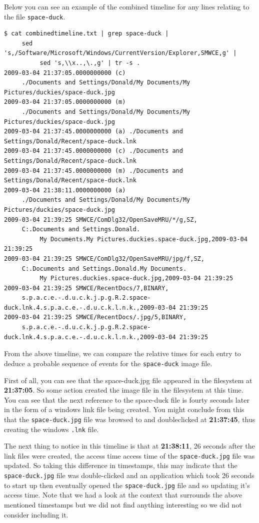 \documentclass[a4paper,
    11pt,
    normalheadings,
    parindent,
    UKenglish,
    abstracton,
    ]{scrartcl}
\begin{document}
Below you can see an example of the combined timeline for any lines relating to the file \texttt{space-duck}.
\begin{verbatim}
$ cat combinedtimeline.txt | grep space-duck |
     sed 's,/Software/Microsoft/Windows/CurrentVersion/Explorer,SMWCE,g' |
          sed 's,\\x..,\.,g' | tr -s .
2009-03-04 21:37:05.0000000000 (c)
     ./Documents and Settings/Donald/My Documents/My Pictures/duckies/space-duck.jpg
2009-03-04 21:37:05.0000000000 (m)
     ./Documents and Settings/Donald/My Documents/My Pictures/duckies/space-duck.jpg
2009-03-04 21:37:45.0000000000 (a) ./Documents and Settings/Donald/Recent/space-duck.lnk
2009-03-04 21:37:45.0000000000 (c) ./Documents and Settings/Donald/Recent/space-duck.lnk
2009-03-04 21:37:45.0000000000 (m) ./Documents and Settings/Donald/Recent/space-duck.lnk
2009-03-04 21:38:11.0000000000 (a)
     ./Documents and Settings/Donald/My Documents/My Pictures/duckies/space-duck.jpg
2009-03-04 21:39:25 SMWCE/ComDlg32/OpenSaveMRU/*/g,SZ,
     C:.Documents and Settings.Donald.
          My Documents.My Pictures.duckies.space-duck.jpg,2009-03-04 21:39:25
2009-03-04 21:39:25 SMWCE/ComDlg32/OpenSaveMRU/jpg/f,SZ,
     C:.Documents and Settings.Donald.My Documents.
          My Pictures.duckies.space-duck.jpg,2009-03-04 21:39:25
2009-03-04 21:39:25 SMWCE/RecentDocs/7,BINARY,
     s.p.a.c.e.-.d.u.c.k.j.p.g.R.2.space-duck.lnk.4.s.p.a.c.e.-.d.u.c.k.l.n.k.,2009-03-04 21:39:25
2009-03-04 21:39:25 SMWCE/RecentDocs/.jpg/5,BINARY,
     s.p.a.c.e.-.d.u.c.k.j.p.g.R.2.space-duck.lnk.4.s.p.a.c.e.-.d.u.c.k.l.n.k.,2009-03-04 21:39:25
\end{verbatim}

From the above timeline, we can compare the relative times for each entry to deduce a probable sequence of events for the \texttt{space-duck} image file.

First of all, you can see that the space-duck.jpg file appeared in the filesystem at \textbf{21:37:05}. So some action created the image file in the filesystem at this time.
You can see that the next reference to the space-duck file is fourty seconds later in the form of a windows link file being created.
You might conclude from this that the \texttt{space-duck.jpg} file was browsed to and doubleclicked at \textbf{21:37:45}, thus creating the windows \texttt{.lnk} file.

The next thing to notice in this timeline is that at \textbf{21:38:11}, 26 seconds after the link files were created, the access time access time of the \texttt{space-duck.jpg} file was updated.
So taking this difference in timestamps, this may indicate that the \texttt{space-duck.jpg} file was double-clicked and an application which took 26 seconds to start up then eventually opened the \texttt{space-duck.jpg} file and so updating it's access time.
Note that we had a look at the context that surrounds the above mentioned timestamps but we did not find anything interesting so we did not consider including it.
\end{document}
